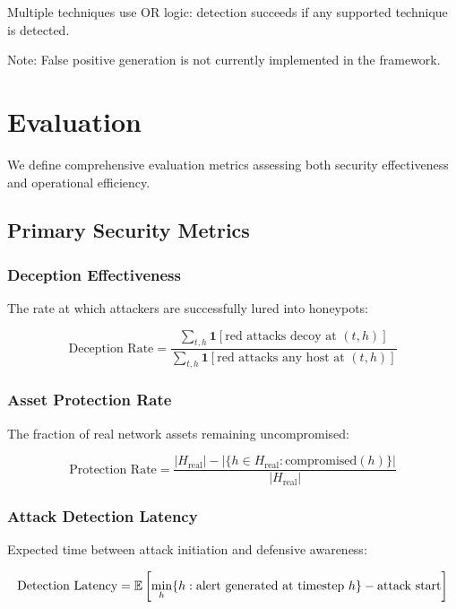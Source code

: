 \documentclass[12pt,twoside]{article}
\begin{document}
Multiple techniques use OR logic: detection succeeds if any supported technique is detected.

Note: False positive generation is not currently implemented in the framework.

\section{Evaluation}

We define comprehensive evaluation metrics assessing both security effectiveness and operational efficiency.

\subsection{Primary Security Metrics}

\subsubsection{Deception Effectiveness}
The rate at which attackers are successfully lured into honeypots:

\begin{equation}
\text{Deception Rate} = \frac{\sum_{t,h} \mathbf{1}[\text{red attacks decoy at } (t,h)]}{\sum_{t,h} \mathbf{1}[\text{red attacks any host at } (t,h)]}
\end{equation}

\subsubsection{Asset Protection Rate}
The fraction of real network assets remaining uncompromised:

\begin{equation}
\text{Protection Rate} = \frac{|H_{\text{real}}| - |\{h \in H_{\text{real}} : \text{compromised}(h)\}|}{|H_{\text{real}}|}
\end{equation}

\subsubsection{Attack Detection Latency}
Expected time between attack initiation and defensive awareness:

\begin{equation}
\text{Detection Latency} = \mathbb{E}\left[\min_h \{h : \text{alert generated at timestep } h\} - \text{attack start}\right]
\end{equation}
\end{document}
